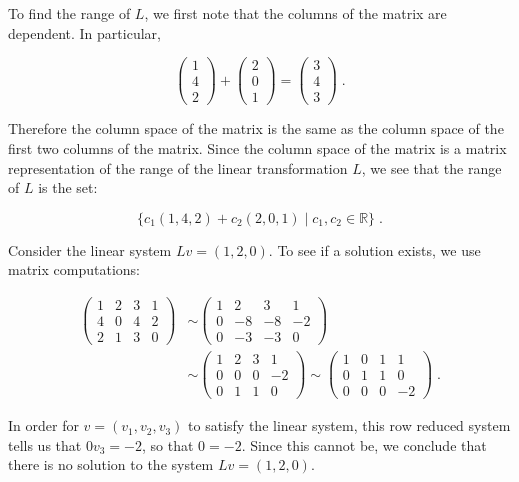 \documentclass[11pt]{article}
\begin{document}
To find the range of $L$, we first note that the columns of the matrix are dependent. In particular, 

$$\begin{pmatrix} 1\\4\\2 \end{pmatrix} + \begin{pmatrix} 2\\0\\1 \end{pmatrix} = \begin{pmatrix} 3\\4\\3 \end{pmatrix} \; .$$

Therefore the column space of the matrix is the same as the column space of the first two columns of the matrix. Since the column space of the matrix is a matrix representation of the range of the linear transformation $L$, we see that the range of $L$ is the set:

$$ \{c_1(1,4,2) + c_2(2,0,1) \; | \; c_1,c_2 \in \mathbb{R}\} \;.$$

Consider the linear system $Lv = (1,2,0)$. To see if a solution exists, we use matrix computations:

\begin{align*}
\begin{pmatrix} 1&2&3&1 \\ 4&0&4&2\\ 2&1&3&0 \end{pmatrix} &\sim \begin{pmatrix} 1&2&3&1 \\ 0&-8&-8&-2\\ 0&-3&-3&0 \end{pmatrix} \\
&\sim \begin{pmatrix} 1&2&3&1 \\ 0&0&0&-2\\ 0&1&1&0 \end{pmatrix} \sim \begin{pmatrix} 1&0&1&1 \\ 0&1&1&0\\ 0&0&0&-2 \end{pmatrix} \;.
\end{align*}

In order for $v = (v_1,v_2,v_3)$ to satisfy the linear system, this row reduced system tells us that $0v_3 = -2$, so that $0 = -2$. Since this cannot be, we conclude that there is no solution to the system $Lv = (1,2,0)$. \\
\end{document}
